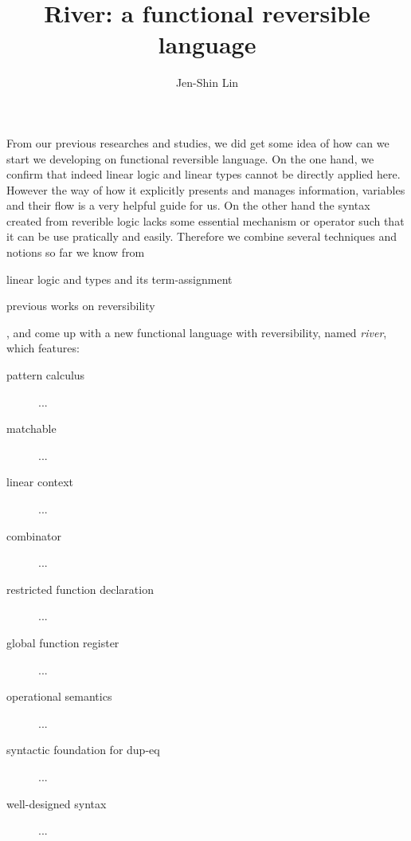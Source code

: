 \documentclass[a4paper,twocolumn]{article}
\title{River: a functional reversible language}
\author{Jen-Shin Lin}
\begin{document}
\maketitle

From our previous researches and studies, we did get some idea of how can we start we developing on functional reversible language. On the one hand, we confirm that indeed linear logic and linear types cannot be directly applied here. However the way of how it explicitly presents and manages information, variables and their flow is a very helpful guide for us. On the other hand the syntax created from reverible logic lacks some essential mechanism or operator such that it can be use pratically and easily. Therefore we combine several techniques and notions so far we know from
\begin{sublist}
\item linear logic and types and its term-assignment \cite{Benton92, Wadler93, Benton93, Ronchi94, Girard95, Turner98, Novitzka07}
\item previous works on reversibility \cite{Yokoyama11, Sparks14, Brown16, Yokoyama16}
\end{sublist}
, and come up with a new functional language with reversibility, named \textit{river}, which features:
\begin{description}
\item[pattern calculus] ...
\item[matchable] ...
\item[linear context] ...
\item[combinator] ...
\item[restricted function declaration] ...
\item[global function register] ...
\item[operational semantics] ...
\item[syntactic foundation for dup-eq] ...
\item[well-designed syntax] ...
\end{description}

\end{document}
